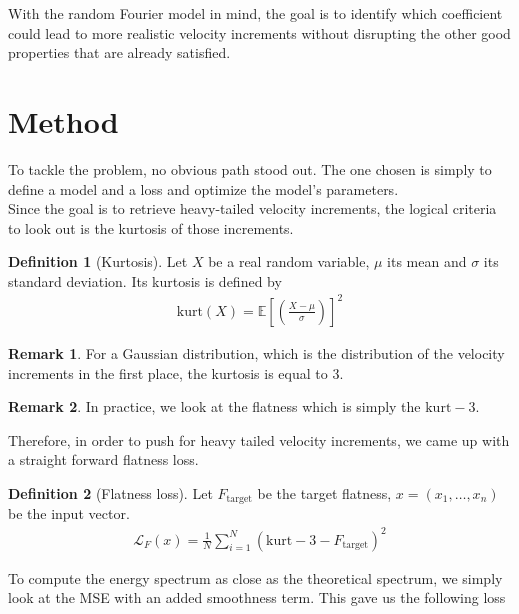 \documentclass[a4paper,12pt]{article}
\theoremstyle{definition}
\newtheorem{definition}{Definition}
\newtheorem{remark}{Remark}
\begin{document}
\bigskip
With the random Fourier model in mind, the goal is to identify which coefficient could lead to more realistic velocity increments without disrupting the other good properties that are already satisfied. 


\section{Method}
To tackle the problem, no obvious path stood out. 
The one chosen is simply to define a model and a loss and optimize the model's parameters. \\
Since the goal is to retrieve heavy-tailed velocity increments, the logical criteria to look out is the kurtosis of those increments. 


\begin{definition}[Kurtosis]
    Let $X$ be a real random variable, $\mu$ its mean and $\sigma$ its standard deviation. Its kurtosis is defined by 
    \begin{align}
    \text{kurt}(X)=\mathbb{E}\left[\left(\frac{X-\mu}{\sigma}\right) \right]^2    
    \end{align}
\end{definition}

\begin{remark}
    For a Gaussian distribution, which is the distribution of the velocity increments in the first place, the kurtosis is equal to 3.
\end{remark}

\begin{remark}
    In practice, we look at the flatness which is simply the $\text{kurt}-3$.
\end{remark}
Therefore, in order to push for heavy tailed velocity increments, we came up with a straight forward flatness loss. 

\begin{definition}[Flatness loss]
    Let $F_\text{target}$ be the target flatness, $x=(x_1,\ldots,x_n)$ be the input vector.
    \begin{align}
        \mathcal{L}_F (x) = \frac{1}{N}\sum_{i=1}^{N}\left( \text{kurt}-3 - F_\text{target}  \right) ^2 
    \end{align}
\end{definition}

To compute the energy spectrum as close as the theoretical spectrum, we simply look at the MSE with an added smoothness term. This gave us the following loss
\end{document}
